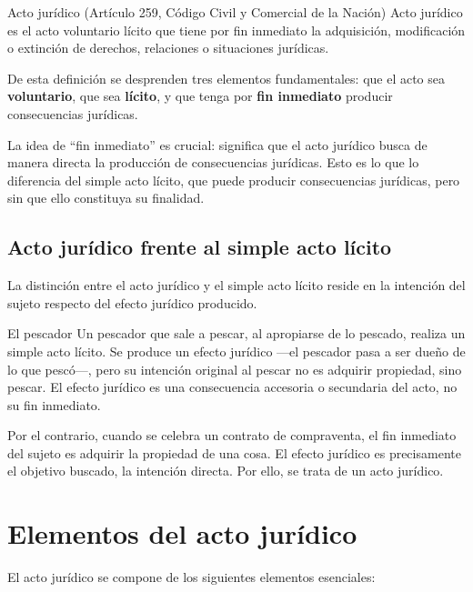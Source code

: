 \documentclass[12pt,oneside]{book}
\begin{document}
\begin{definition}{Acto jurídico (Artículo 259, Código Civil y Comercial de la Nación)}
Acto jurídico es el acto voluntario lícito que tiene por fin inmediato la adquisición, modificación o extinción de derechos, relaciones o situaciones jurídicas.
\end{definition}

De esta definición se desprenden tres elementos fundamentales: que el acto sea \textbf{voluntario}, que sea \textbf{lícito}, y que tenga por \textbf{fin inmediato} producir consecuencias jurídicas.

\begin{important}
La idea de ``fin inmediato'' es crucial: significa que el acto jurídico busca de manera directa la producción de consecuencias jurídicas. Esto es lo que lo diferencia del simple acto lícito, que puede producir consecuencias jurídicas, pero sin que ello constituya su finalidad.
\end{important}

\section{Acto jurídico frente al simple acto lícito}

La distinción entre el acto jurídico y el simple acto lícito reside en la intención del sujeto respecto del efecto jurídico producido.

\begin{example}{El pescador}
Un pescador que sale a pescar, al apropiarse de lo pescado, realiza un simple acto lícito. Se produce un efecto jurídico —el pescador pasa a ser dueño de lo que pescó—, pero su intención original al pescar no es adquirir propiedad, sino pescar. El efecto jurídico es una consecuencia accesoria o secundaria del acto, no su fin inmediato.

Por el contrario, cuando se celebra un contrato de compraventa, el fin inmediato del sujeto es adquirir la propiedad de una cosa. El efecto jurídico es precisamente el objetivo buscado, la intención directa. Por ello, se trata de un acto jurídico.
\end{example}

\chapter{Elementos del acto jurídico}

El acto jurídico se compone de los siguientes elementos esenciales:
\end{document}
